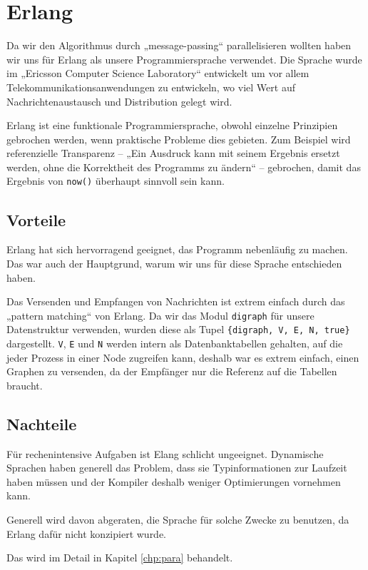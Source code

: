 \chapter{Erlang}
Da wir den Algorithmus durch „message-passing“ parallelisieren wollten
haben wir uns für Erlang als unsere Programmiersprache verwendet.  Die
Sprache wurde im „Ericsson Computer Science Laboratory“ entwickelt um
vor allem Telekommunikationsanwendungen zu entwickeln, wo viel Wert
auf Nachrichtenaustausch und Distribution gelegt wird.

Erlang ist eine funktionale Programmiersprache, obwohl einzelne
Prinzipien gebrochen werden, wenn praktische Probleme dies gebieten.
Zum Beispiel wird referenzielle Transparenz – „Ein Ausdruck kann mit
seinem Ergebnis ersetzt werden, ohne die Korrektheit des Programms zu
ändern“ – gebrochen, damit das Ergebnis von \texttt{now()} überhaupt
sinnvoll sein kann.

\section{Vorteile}
Erlang hat sich hervorragend geeignet, das Programm nebenläufig zu
machen.  Das war auch der Hauptgrund, warum wir uns für diese Sprache
entschieden haben.

Das Versenden und Empfangen von Nachrichten ist extrem einfach durch
das „pattern matching“ von Erlang.  Da wir das Modul
\lstinline{digraph} für unsere Datenstruktur verwenden, wurden diese
als Tupel \lstinline!{digraph, V, E, N, true}!  dargestellt.
\lstinline!V!, \lstinline!E! und \lstinline!N! werden intern als
Datenbanktabellen gehalten, auf die jeder Prozess in einer Node
zugreifen kann, %
deshalb war es extrem einfach, einen Graphen zu versenden, da der
Empfänger nur die Referenz auf die Tabellen braucht.
\section{Nachteile}
Für rechenintensive Aufgaben ist Elang schlicht ungeeignet.
Dynamische Sprachen haben generell das Problem, dass sie
Typinformationen zur Laufzeit haben müssen und der Kompiler deshalb
weniger Optimierungen vornehmen kann.

Generell wird davon abgeraten, die Sprache für solche Zwecke zu
benutzen, da Erlang dafür nicht konzipiert wurde.
\cite[Kapitel~3]{lyse}

Das wird im Detail in Kapitel \ref{chp:para}
behandelt.
